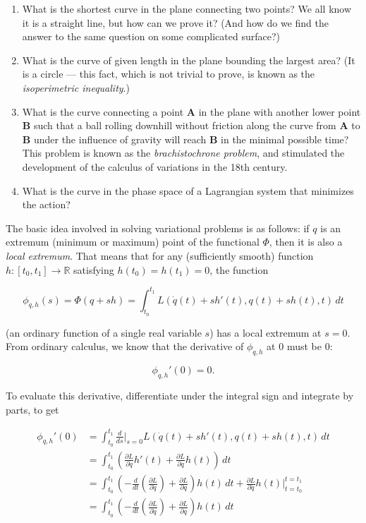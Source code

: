 \documentclass[11pt]{report}
\newcommand{\R}{\mathbb{R}}
\theoremstyle{plain}
\theoremstyle{definition}
\begin{document}
\begin{enumerate}[label=\arabic*.]
\item What is the shortest curve in the plane connecting two
points? We all know it is a straight line, but how can
we prove it? (And how do we find the answer to the
same question on some complicated surface?)

\item What is the curve of given length in the plane
bounding the largest area? (It is a circle --- this
fact, which is not trivial to prove, is known as the
\emph{isoperimetric inequality}.)

\item What is the curve connecting a point $\mathbf{A}$ in
the plane with another lower point $\mathbf{B}$ such
that a ball rolling downhill without friction along
the curve from $\mathbf{A}$ to $\mathbf{B}$ under the
influence of gravity will reach $\mathbf{B}$ in the
minimal possible time? This problem is known as the
\emph{brachistochrone problem}, and stimulated the
development of the calculus of variations in the 18th
century.

\item What is the curve in the phase space of a Lagrangian
system that minimizes the action?
\end{enumerate}

\noindent The basic idea involved in solving variational
problems is as follows: if $q$ is an extremum (minimum
or maximum) point of the functional $\Phi$, then it is
also a \emph{local extremum}. That means that for any
(sufficiently smooth) function $h:[t_0,t_1]\to \R$
satisfying $h(t_0)=h(t_1)=0$, the function

\[
\phi_{q,h}(s) = \Phi(q+s h)=\int_{t_0}^{t_1} L(\dot{q}(t)+sh'(t),q(t)+sh(t),t)\,dt
\]

\noindent (an ordinary function of a single real variable $s$)
has a local extremum at $s=0$. From ordinary calculus,
we know that the derivative of $\phi_{q,h}$ at $0$
must be $0$:

\[
\phi_{q,h}'(0) = 0.
\]

\noindent To evaluate this derivative, differentiate under the
integral sign and integrate by parts, to get

\begin{align*}
\phi_{q,h}'(0)
&=
\int_{t_0}^{t_1} \frac{d}{ds} \Big|_{s=0}  L(\dot{q}(t)+sh'(t),q(t)+sh(t),t)\,dt
\\
&= \int_{t_0}^{t_1} \left(\frac{\partial L}{\partial \dot{q}} h'(t) + \frac{\partial L}{\partial q} h(t) \right)\,dt \\
&=
\int_{t_0}^{t_1} \left(-\frac{d}{dt}\left(\frac{\partial L}{\partial \dot{q}}\right) + \frac{\partial L}{\partial q} \right)h(t)\,dt
+ \frac{\partial L}{\partial \dot{q}} h(t)\Big|_{t=t_0}^{t=t_1} \\
&= \int_{t_0}^{t_1} \left(-\frac{d}{dt}\left(\frac{\partial L}{\partial \dot{q}}\right) + \frac{\partial L}{\partial q} \right)h(t)\,dt
\end{align*}
\end{document}
